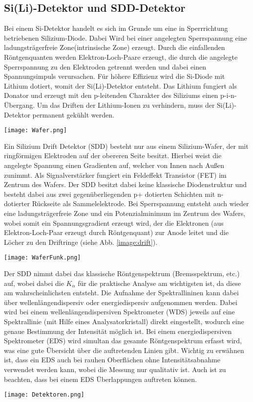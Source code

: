 \subsection*{Si(Li)-Detektor und SDD-Detektor}
\label{sub:siliDetect}
Bei einem Si-Detektor handelt es sich im Grunde um eine in Sperrrichtung betriebenen Silizium-Diode. Dabei Wird bei einer angelegten Sperrspannung eine ladungsträgerfreie Zone(intrinsische Zone) erzeugt. Durch die einfallenden Röntgenquanten werden Elektron-Loch-Paare erzeugt, die durch die angelegte Sperrspannung zu den Elektroden getrennt werden und dabei einen Spannungsimpuls verursachen. Für höhere Effizienz wird die Si-Diode mit Lithium dotiert, womit der Si(Li)-Detektor entsteht. Das Lithium fungiert als Donator und erzeugt mit den p-leitenden Charakter des Siliziums einen p-i-n-Übergang. Um das Driften der Lithium-Ionen zu verhindern, muss der Si(Li)-Detektor permanent gekühlt werden. \citep{RasterEM}
\begin{center}
    \texttt{[image: Wafer.png]}
    \label{image:sddDetect}
\end{center}
Ein Silizium Drift Detektor (SDD) besteht nur aus einem Silizium-Wafer, der mit ringförmigen Elektroden auf der obereren Seite besitzt. Hierbei weist die angelegte Spannung einen Gradienten auf, welcher von Innen nach Außen zunimmt. Als Signalverstärker fungiert ein Feldeffekt Transistor (FET) im Zentrum des Wafers. Der SDD besitzt dabei keine klassische Diodenstruktur und besteht dabei aus zwei gegenüberliegenden p+ dotierten Schichten mit n- dotierter Rückseite als Sammelelektrode. Bei Sperrspannung entsteht auch wieder eine ladungsträgerfreie Zone und ein Potenzialminimum im Zentrum des Wafers, wobei somit ein Spannungsgradient erzeugt wird, der die Elektronen (aus Elektron-Loch-Paar erzeugt durch Röntgenquant) zur Anode leitet und die Löcher zu den Driftringe (siehe Abb. \ref{image:drift}).
\begin{center}
    \texttt{[image: WaferFunk.png]}
    \label{image:drift}
\end{center}
Der SDD nimmt dabei das klassische Röntgenspektrum (Bremsspektrum, etc.) auf, wobei dabei die $K_\alpha$ für die praktische Analyse am wichtigsten ist, da diese am wahrscheinlichsten entsteht. Die Aufnahme der Spektrallininen kann dabei über wellenlängendispersiv oder energiedispersiv aufgenommen werden. Dabei wird bei einem wellenlängendispersiven Spektrometer (WDS) jeweils auf eine Spektrallinie (mit Hilfe eines Analysatorkristall) direkt eingestellt, wodurch eine genaue Bestimmung der Intensität möglich ist. Bei einem energiedispersiven Spektrometer (EDS) wird simultan das gesamte Röntgenspektrum erfasst wird, was eine gute Übersicht über die auftretenden Linien gibt. Wichtig zu erwähnen ist, dass ein EDS auch bei rauhen Oberflächen ohne Intensitätsabnahme verwendet werden kann, wobei die Messung nur qualitativ ist. Auch ist zu beachten, dass bei einem EDS Überlappungen auftreten können. \citep{RasterEM}
\begin{center}
    \texttt{[image: Detektoren.png]}
    \label{image:jeolDetect}
\end{center}
\newpage
